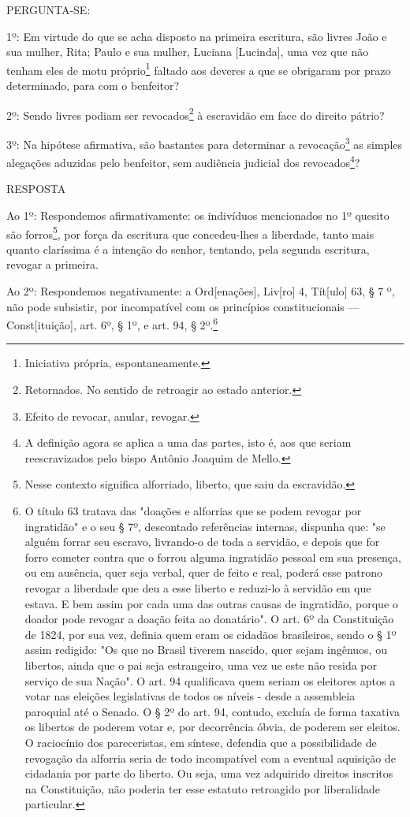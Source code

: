 PERGUNTA-SE:

1º: Em virtude do que se acha disposto na primeira escritura, são livres
João e sua mulher, Rita; Paulo e sua mulher, Luciana {[}Lucinda{]}, uma
vez que não tenham eles de motu próprio\footnote{Iniciativa própria,
  espontaneamente.} faltado aos deveres a que se obrigaram por prazo
determinado, para com o benfeitor?

2º: Sendo livres podiam ser revocados\footnote{Retornados. No sentido
  de retroagir ao estado anterior.} à escravidão em face do direito
pátrio?

3º: Na hipótese afirmativa, são bastantes para determinar a
revocação\footnote{Efeito de revocar, anular, revogar.} as simples
alegações aduzidas pelo benfeitor, sem audiência judicial dos
revocados\footnote{A definição agora se aplica a uma das partes, isto
  é, aos que seriam reescravizados pelo bispo Antônio Joaquim de Mello.}?

RESPOSTA

Ao 1º: Respondemos afirmativamente: os indivíduos mencionados no 1º
quesito são forros\footnote{Nesse contexto significa alforriado,
  liberto, que saiu da escravidão.}, por força da escritura que
concedeu-lhes a liberdade, tanto mais quanto claríssima é a intenção do
senhor, tentando, pela segunda escritura, revogar a primeira.

Ao 2º: Respondemos negativamente: a Ord{[}enações{]}, Liv{[}ro{]} 4,
Tít{[}ulo{]} 63, § 7 º, não pode subsistir, por incompatível com os
princípios constitucionais --- Const{[}ituição{]}, art. 6º, § 1º, e
art. 94, § 2º.\footnote{O título 63 tratava das "doações e alforrias
  que se podem revogar por ingratidão" e o seu § 7º, descontado
  referências internas, dispunha que: "se alguém forrar seu escravo,
  livrando-o de toda a servidão, e depois que for forro cometer contra
  que o forrou alguma ingratidão pessoal em sua presença, ou em
  ausência, quer seja verbal, quer de feito e real, poderá esse patrono
  revogar a liberdade que deu a esse liberto e reduzi-lo à servidão em
  que estava. E bem assim por cada uma das outras causas de ingratidão,
  porque o doador pode revogar a doação feita ao donatário". O art. 6º
  da Constituição de 1824, por sua vez, definia quem eram os cidadãos
  brasileiros, sendo o § 1º assim redigido: "Os que no Brasil tiverem
  nascido, quer sejam ingênuos, ou libertos, ainda que o pai seja
  estrangeiro, uma vez ue este não resida por serviço de sua Nação". O
  art. 94 qualificava quem seriam os eleitores aptos a votar nas
  eleições legislativas de todos os níveis - desde a assembleia
  paroquial até o Senado. O § 2º do art. 94, contudo, excluía de forma
  taxativa os libertos de poderem votar e, por decorrência óbvia, de
  poderem ser eleitos. O raciocínio dos pareceristas, em síntese,
  defendia que a possibilidade de revogação da alforria seria de todo
  incompatível com a eventual aquisição de cidadania por parte do
  liberto. Ou seja, uma vez adquirido direitos inscritos na
  Constituição, não poderia ter esse estatuto retroagido por
  liberalidade particular.}

